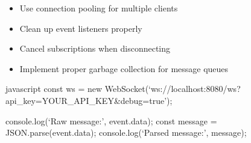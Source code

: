 \documentclass[letterpaper,10pt,english]{sphinxmanual}
\begin{document}
\begin{description}
\begin{itemize}
\item {} 
\sphinxAtStartPar
Use connection pooling for multiple clients

\end{itemize}

\begin{itemize}
\item {} 
\sphinxAtStartPar
Clean up event listeners properly

\item {} 
\sphinxAtStartPar
Cancel subscriptions when disconnecting

\item {} 
\sphinxAtStartPar
Implement proper garbage collection for message queues

\end{itemize}

\end{description}

\sphinxAtStartPar
{}
{\color{red}\bfseries{}\textasciigrave{}\textasciigrave{}}{\color{red}\bfseries{}\textasciigrave{}}javascript
const ws = new WebSocket(‘ws://localhost:8080/ws?api\_key=YOUR\_API\_KEY\&debug=true’);
\begin{description}
\sphinxAtStartPar
console.log(‘Raw message:’, event.data);
const message = JSON.parse(event.data);
console.log(‘Parsed message:’, message);

\end{description}
\end{document}

